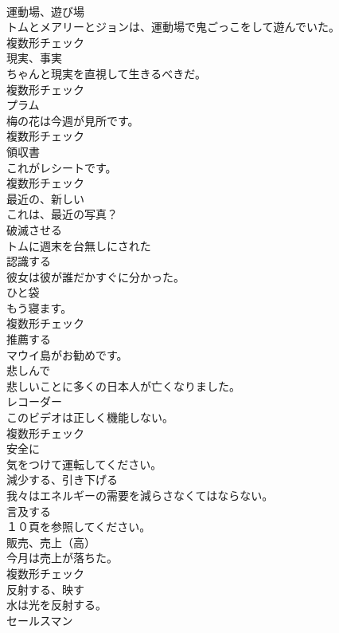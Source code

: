 \documentclass[8pt]{extreport}
\begin{document}
\begin{CJK}{UTF8}{min}
\\	[名詞]	運動場、遊び場	
\\	トムとメアリーとジョンは、運動場で鬼ごっこをして遊んでいた。	
\\	複数形チェック
\\	[名詞]	現実、事実	
\\	ちゃんと現実を直視して生きるべきだ。	
\\	複数形チェック
\\	[名詞]	プラム	
\\	梅の花は今週が見所です。	
\\	複数形チェック
\\	[名詞]	領収書	
\\	これがレシートです。	
\\	複数形チェック
\\	[形容詞]	最近の、新しい	
\\	これは、最近の写真？	
\\	[動詞]	破滅させる	
\\	トムに週末を台無しにされた	
\\	[動詞]	認識する	
\\	彼女は彼が誰だかすぐに分かった。	
\\	[名詞]	ひと袋	
\\	もう寝ます。	
\\	複数形チェック
\\	[動詞]	推薦する	
\\	マウイ島がお勧めです。	
\\	[副詞]	悲しんで	
\\	悲しいことに多くの日本人が亡くなりました。	
\\	[名詞]	レコーダー	
\\	このビデオは正しく機能しない。	
\\	複数形チェック
\\	[副詞]	安全に	
\\	気をつけて運転してください。	
\\	[動詞]	減少する、引き下げる	
\\	我々はエネルギーの需要を減らさなくてはならない。	
\\	[動詞]	言及する	
\\	１０頁を参照してください。	
\\	[名詞]	販売、売上（高）	
\\	今月は売上が落ちた。	
\\	複数形チェック
\\	[動詞]	反射する、映す	
\\	水は光を反射する。	
\\	[名詞]	セールスマン	

\end{CJK}
\end{document}
